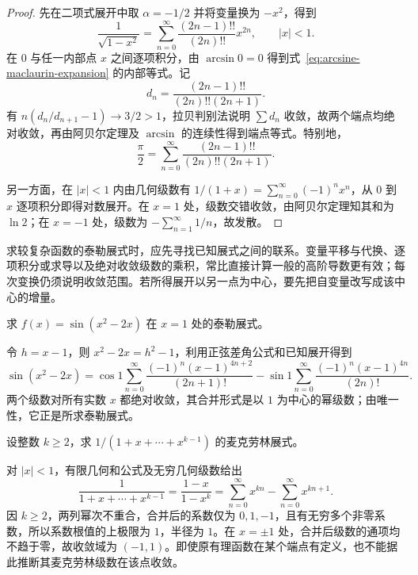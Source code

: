 \documentclass[UTF8,12pt,a4paper,fontset=fandol]{ctexbook}
\begin{document}
\begin{proof}
先在二项式展开中取 $\alpha=-1/2$ 并将变量换为 $-x^2$，得到
\[
    \frac1{\sqrt{1-x^2}}
       =\sum_{n=0}^\infty\frac{(2n-1)!!}{(2n)!!}x^{2n},
    \qquad |x|<1.
\]
在 $0$ 与任一内部点 $x$ 之间逐项积分，由 $\arcsin0=0$ 得到式~\eqref{eq:arcsine-maclaurin-expansion} 的内部等式。记
\[
    d_n=\frac{(2n-1)!!}{(2n)!!(2n+1)}.
\]
有 $n(d_n/d_{n+1}-1)\to3/2>1$，拉贝判别法说明 $\sum d_n$ 收敛，故两个端点均绝对收敛，再由阿贝尔定理及 $\arcsin$ 的连续性得到端点等式。特别地，
\begin{equation}
    \frac\pi2=\sum_{n=0}^\infty
       \frac{(2n-1)!!}{(2n)!!(2n+1)}.
    \label{eq:pi-by-arcsine-series}
\end{equation}

另一方面，在 $|x|<1$ 内由几何级数有 $1/(1+x)=\sum_{n=0}^\infty(-1)^nx^n$，从 $0$ 到 $x$ 逐项积分即得对数展开。在 $x=1$ 处，级数交错收敛，由阿贝尔定理知其和为 $\ln2$；在 $x=-1$ 处，级数为 $-\sum_{n=1}^\infty1/n$，故发散。
\end{proof}

求较复杂函数的泰勒展式时，应先寻找已知展式之间的联系。变量平移与代换、逐项积分或求导以及绝对收敛级数的乘积，常比直接计算一般的高阶导数更有效；每次变换仍须说明收敛范围。若所得展开以另一点为中心，要先把自变量改写成该中心的增量。

\begin{example}
\label{ex:shifted-sine-composition-taylor-expansion}
求 $f(x)=\sin(x^2-2x)$ 在 $x=1$ 处的泰勒展式。
\end{example}

\begin{solve}
令 $h=x-1$，则 $x^2-2x=h^2-1$，利用正弦差角公式和已知展开得到
\[
    \sin(x^2-2x)
       =\cos1\sum_{n=0}^\infty
           \frac{(-1)^n(x-1)^{4n+2}}{(2n+1)!}
        -\sin1\sum_{n=0}^\infty
           \frac{(-1)^n(x-1)^{4n}}{(2n)!}.
\]
两个级数对所有实数 $x$ 都绝对收敛，其合并形式是以 $1$ 为中心的幂级数；由唯一性，它正是所求泰勒展式。
\end{solve}

\begin{example}
\label{ex:finite-geometric-denominator-expansion}
设整数 $k\geq2$，求 $\displaystyle1/(1+x+\cdots+x^{k-1})$ 的麦克劳林展式。
\end{example}

\begin{solve}
对 $|x|<1$，有限几何和公式及无穷几何级数给出
\[
    \frac1{1+x+\cdots+x^{k-1}}
       =\frac{1-x}{1-x^k}
       =\sum_{n=0}^\infty x^{kn}-\sum_{n=0}^\infty x^{kn+1}.
\]
因 $k\geq2$，两列幂次不重合，合并后的系数仅为 $0,1,-1$，且有无穷多个非零系数，所以系数根值的上极限为 $1$，半径为 $1$。在 $x=\pm1$ 处，合并后级数的通项均不趋于零，故收敛域为 $(-1,1)$。即使原有理函数在某个端点有定义，也不能据此推断其麦克劳林级数在该点收敛。
\end{solve}
\end{document}
